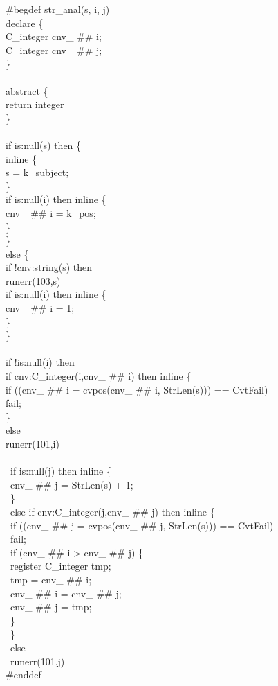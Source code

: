 \begin{iconcode}
\#begdef str\_anal(s, i, j)\\
\>declare \{\\
\>\>C\_integer cnv\_ \#\# i;\\
\>\>C\_integer cnv\_ \#\# j;\\
\>\>\}\\
\\
\>abstract \{\\
\>\>return integer\\
\>\>\}\\
\\
\>if is:null(s) then \{\\
\>\>inline \{\\
\>\>\>s = k\_subject;\\
\>\>\>\}\\
\>\>if is:null(i) then inline \{\\
\>\>\>cnv\_ \#\# i = k\_pos;\\
\>\>\>\}\\
\>\>\}\\
\>else \{\\
\>\>if !cnv:string(s) then\\
\>\>\>runerr(103,s)\\
\>\>if is:null(i) then inline \{\\
\>\>\>cnv\_ \#\# i = 1;\\
\>\>\>\}\\
\>\>\}\\
\\
\>if !is:null(i) then\\
\>\>if cnv:C\_integer(i,cnv\_ \#\# i) then inline \{\\
\>\>\>if ((cnv\_ \#\# i = cvpos(cnv\_ \#\# i, StrLen(s))) == CvtFail)\\
\>\>\>\>fail;\\
\>\>\>\}\\
\>\>else\\
\>\>\>runerr(101,i)\\
\\
\>\ if is:null(j) then inline \{\\
\>\>\ cnv\_ \#\# j = StrLen(s) + 1;\\
\>\>\ \}\\
\>\ else if cnv:C\_integer(j,cnv\_ \#\# j) then inline \{\\
\>\>\ if ((cnv\_ \#\# j = cvpos(cnv\_ \#\# j, StrLen(s))) == CvtFail)\\
\>\>\>\ fail;\\
\>\>\ if (cnv\_ \#\# i > cnv\_ \#\# j) \{\\
\>\>\>\ register C\_integer tmp;\\
\>\>\>\ tmp = cnv\_ \#\# i;\\
\>\>\>\ cnv\_ \#\# i = cnv\_ \#\# j;\\
\>\>\>\ cnv\_ \#\# j = tmp;\\
\>\>\>\ \}\\
\>\>\ \}\\
\>\ else\\
\>\>\ runerr(101,j)\\
\#enddef
\end{iconcode}


